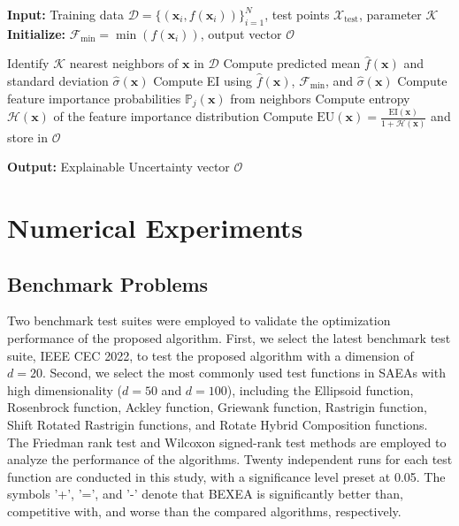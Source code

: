 \documentclass[review]{elsarticle}
\begin{document}
\begin{algorithm}
\caption{Computation of Explainable Uncertainty Criteria}\label{alg: EU}
\begin{algorithmic}[1]
    \State \textbf{Input:} Training data $\mathcal{D} = \{(\boldsymbol{x}_i, f(\boldsymbol{x}_i))\}_{i=1}^N$, test points $\mathcal{X}_{\text{test}}$, parameter $\mathcal{K}$
    \State \textbf{Initialize:} $\mathcal{F}_{\text{min}} = \min(f(\boldsymbol{x}_i))$, output vector $\mathcal{O}$
    
        \State Identify $\mathcal{K}$ nearest neighbors of $\boldsymbol{x}$ in $\mathcal{D}$
        \State Compute predicted mean $\hat{f}(\boldsymbol{x})$ and standard deviation $\hat{\sigma}(\boldsymbol{x})$
        \State Compute EI using $\hat{f}(\boldsymbol{x})$, $\mathcal{F}_{\text{min}}$, and $\hat{\sigma}(\boldsymbol{x})$
        \State Compute feature importance probabilities $\mathbb{P}_j(\boldsymbol{x})$ from neighbors
        \State Compute entropy $\mathcal{H}(\boldsymbol{x})$ of the feature importance distribution
        \State Compute $\text{EU}(\boldsymbol{x}) = \frac{\text{EI}(\boldsymbol{x})}{1 + \mathcal{H}(\boldsymbol{x})}$ and store in $\mathcal{O}$
    \EndFor
    
    \State \textbf{Output:} Explainable Uncertainty vector $\mathcal{O}$
\end{algorithmic}
\end{algorithm}

\section{Numerical Experiments}

\subsection{Benchmark Problems}
Two benchmark test suites were employed to validate the optimization performance of the proposed algorithm. First, we select the latest benchmark test suite, IEEE CEC 2022, to test the proposed algorithm with a dimension of $d=20$. Second, we select the most commonly used test functions in SAEAs with high dimensionality ($d=50$ and $d=100$), including the Ellipsoid function, Rosenbrock function, Ackley function, Griewank function, Rastrigin function, Shift Rotated Rastrigin functions, and Rotate Hybrid Composition functions. The Friedman rank test and Wilcoxon signed-rank test methods are employed to analyze the performance of the algorithms. Twenty independent runs for each test function are conducted in this study, with a significance level preset at 0.05. The symbols '+', '=', and '-' denote that BEXEA is significantly better than, competitive with, and worse than the compared algorithms, respectively.
\end{document}
